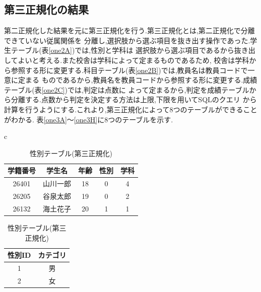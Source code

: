 \documentclass[a4j]{jarticle}
\begin{document}
    \subsection{第三正規化の結果}
    第二正規化した結果を元に第三正規化を行う.第三正規化とは,第二正規化で分離できていない従属関係を
    分離し,選択肢から選ぶ項目を抜き出す操作であった.学生テーブル(表\ref{one2A})では,性別と学科は
    選択肢から選ぶ項目であるから抜き出してよいと考える.また校舎は学科によって定まるものであるため,
    校舎は学科から参照する形に変更する.科目テーブル(表\ref{one2B})では,教員名は教員コードで一意に定まる
    ものであるから,教員名を教員コードから参照する形に変更する.成績テーブル(表\ref{one2C})では,判定は点数に
    よって定まるから,判定を成績テーブルから分離する.点数から判定を決定する方法は上限,下限を用いてSQLのクエリ
    から計算を行うようにする.これより,第三正規化によって8つのテーブルができることがわかる.
    表\ref{one3A}～\ref{one3H}に8つのテーブルを示す.

    \begin{table}[H]
      \begin{center}
        \begin{tabular}{c}

          \begin{minipage}{0.5\hsize}
      \caption{学生テーブル(第三正規化)}
      \label{one3A}
      \begin{center}
        \begin{tabular}{c|c|c|c|c}\hline
          学籍番号 & 学生名 & 年齢 & 性別 & 学科 \\ \hline \hline
          26401 & 山川一郎 & 18 & 0 & 4 \\ \hline 
          26205 & 谷泉太郎 & 19 & 0 & 2 \\ \hline 
          26132 & 海土花子 & 20 & 1 & 1 \\ \hline 
        \end{tabular}
      \end{center}
    \end{minipage}

    \begin{minipage}{0.5\hsize}
        \caption{性別テーブル(第三正規化)}
        \label{one3B}
        \begin{center}
          \begin{tabular}{c|c}\hline
            性別ID & カテゴリ  \\ \hline \hline
            1 & 男  \\ \hline
            2 & 女  \\ \hline
          \end{tabular}
        \end{center}
      \end{minipage}
    \end{tabular}
  \end{center}
        \end{table}
\end{document}

